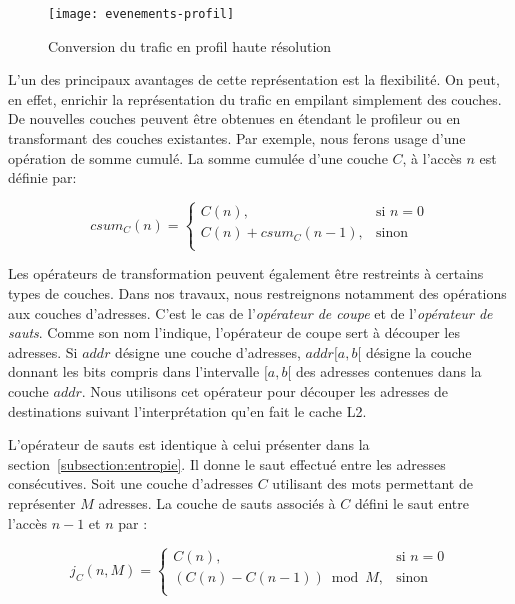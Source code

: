 \begin{figure}[H]
	\texttt{[image: evenements-profil]}
	\caption{\label{fig:evenements-profil} Conversion du trafic en profil haute résolution}
\end{figure}

L'un des principaux avantages de cette représentation est la flexibilité.
On peut, en effet, enrichir la représentation du trafic en empilant simplement des couches.
De nouvelles couches peuvent être obtenues en étendant le profileur ou en transformant des couches existantes.
Par exemple, nous ferons usage d'une opération de somme cumulé.
La somme cumulée d'une couche $C$, à l'accès $n$ est définie par:

\begin{equation}
	csum_{C}(n) =
	\begin{cases}
		C(n), & \text{si } n = 0 \\
		C(n) + csum_{C}(n - 1), & \text{sinon} \\
	\end{cases}
	\label{equation:csum}
\end{equation}

Les opérateurs de transformation peuvent également être restreints à certains types de couches.
Dans nos travaux, nous restreignons notamment des opérations aux couches d'adresses.
C'est le cas de l'\emph{opérateur de coupe} et de l'\emph{opérateur de sauts}. 
Comme son nom l'indique, l'opérateur de coupe sert à découper les adresses.
Si $addr$ désigne une couche d'adresses, $addr[a, b[$ désigne la couche donnant les bits compris dans l'intervalle $[a, b[$ des adresses contenues dans la couche $addr$.
Nous utilisons cet opérateur pour découper les adresses de destinations suivant l'interprétation qu'en fait le cache L2.

L'opérateur de sauts est identique à celui présenter dans la section~\ref{subsection:entropie}.
Il donne le saut effectué entre les adresses consécutives.
Soit une couche d'adresses $C$ utilisant des mots permettant de représenter $M$ adresses.
La couche de sauts associés à $C$ défini le saut entre l'accès $n-1$ et $n$ par : 

\begin{equation}
	j_{C}(n, M) =
	\begin{cases}
		C(n), & \text{si } n = 0 \\
		(C(n) - C(n-1)) \bmod M, & \text{sinon} \\
	\end{cases}
	\label{equation:jump}
\end{equation} 

